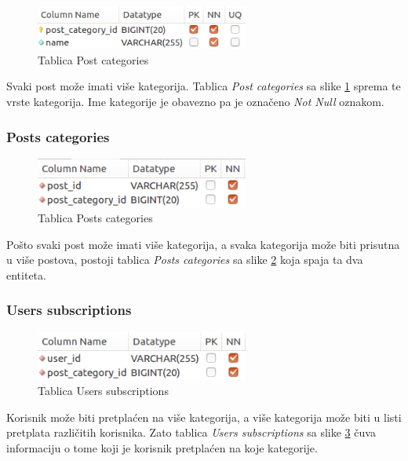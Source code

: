 \documentclass[zavrsni, numeric]{fer}
\begin{document}
\begin{figure}[H]
	\centering
	\includegraphics[width=7cm]{slike/t-post_categories.png}
	\caption{Tablica Post categories}
	\label{fig:t-post_categories}
\end{figure}

Svaki post može imati više kategorija. Tablica \textit{Post categories} sa slike \ref{fig:t-post_categories} sprema te vrste kategorija. Ime kategorije je obavezno pa je označeno \textit{Not Null} oznakom.

\subsubsection{Posts categories}

\begin{figure}[H]
	\centering
	\includegraphics[width=7cm]{slike/t-posts_categories.png}
	\caption{Tablica Posts categories}
	\label{fig:t-posts_categories}
\end{figure}

Pošto svaki post može imati više kategorija, a svaka kategorija može biti prisutna u više postova, postoji tablica \textit{Posts categories} sa slike \ref{fig:t-posts_categories} koja spaja ta dva entiteta.

\subsubsection{Users subscriptions}

\begin{figure}[H]
	\centering
	\includegraphics[width=7cm]{slike/t-users_subscriptions.png}
	\caption{Tablica Users subscriptions}
	\label{fig:t-users_subscriptions}
\end{figure}

Korisnik može biti pretplaćen na više kategorija, a više kategorija može biti u listi pretplata različitih korisnika. Zato tablica \textit{Users subscriptions} sa slike \ref{fig:t-users_subscriptions} čuva informaciju o tome koji je korisnik pretplaćen na koje kategorije.
\end{document}

